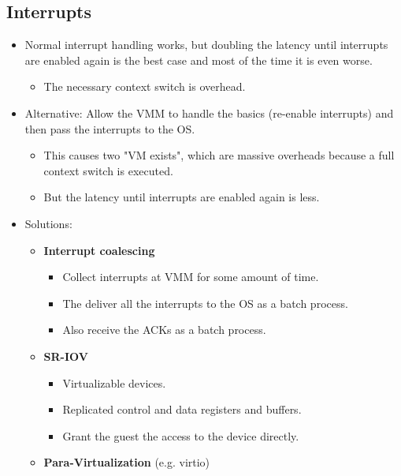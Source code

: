 		\subsection{Interrupts}
			\begin{itemize}
				\item Normal interrupt handling works, but doubling the latency until interrupts are enabled again is the best case and most of the time it is even worse.
					\begin{itemize}
						\item The necessary context switch is overhead.
					\end{itemize}
				\item Alternative: Allow the VMM to handle the basics (re-enable interrupts) and then pass the interrupts to the OS.
					\begin{itemize}
						\item This causes two "VM exists", which are massive overheads because a full context switch is executed.
						\item But the latency until interrupts are enabled again is less.
					\end{itemize}
				\item Solutions:
					\begin{itemize}
						\item \textbf{Interrupt coalescing}
							\begin{itemize}
								\item Collect interrupts at VMM for some amount of time.
								\item The deliver all the interrupts to the OS as a batch process.
								\item Also receive the ACKs as a batch process.
							\end{itemize}
						\item \textbf{SR-IOV}
							\begin{itemize}
								\item Virtualizable devices.
								\item Replicated control and data registers and buffers.
								\item Grant the guest the access to the device directly.
							\end{itemize}
						\item \textbf{Para-Virtualization} (e.g. virtio)
					\end{itemize}
			\end{itemize}

